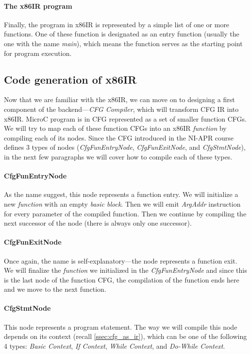 \documentclass[thesis=M,english]{FITthesis}[2019/12/23]
\begin{document}
\paragraph*{The x86IR program} Finally, the program in x86IR is represented by a simple list of one or more functions. One of these function is designated as an entry function (usually the one with the name \emph{main}), which means the function serves as the starting point for program execution.

\subsection{Code generation of x86IR}\label{ssec:x86ir_gen}
Now that we are familiar with the x86IR, we can move on to designing a first component of the backend---\emph{CFG Compiler}, which will transform CFG IR into x86IR. MicroC program is in CFG represented as a set of smaller function CFGs. We will try to map each of these function CFGs into an x86IR \emph{function} by compiling each of its nodes. Since the CFG introduced in the NI-APR course defines 3 types of nodes (\emph{CfgFunEntryNode}, \emph{CfgFunExitNode}, and \emph{CfgStmtNode}), in the next few paragraphs we will cover how to compile each of these types.

\paragraph*{CfgFunEntryNode} As the name suggest, this node represents a function entry. We will initialize a new \emph{function} with an empty \emph{basic block}. Then we will emit \emph{ArgAddr} instruction for every parameter of the compiled function. Then we continue by compiling the next successor of the node (there is always only one successor).

\paragraph*{CfgFunExitNode} Once again, the name is self-explanatory---the node represents a function exit. We will finalize the \emph{function} we initialized in the \emph{CfgFunEntryNode} and since this is the last node of the function CFG, the compilation of the function ends here and we move to the next function.

\paragraph*{CfgStmtNode} This node represents a program statement. The way we will compile this node depends on its context (recall \autoref{ssec:cfg_as_ir}), which can be one of the following 4 types: \emph{Basic Context}, \emph{If Context}, \emph{While Context}, and \emph{Do-While Context}.
\end{document}
